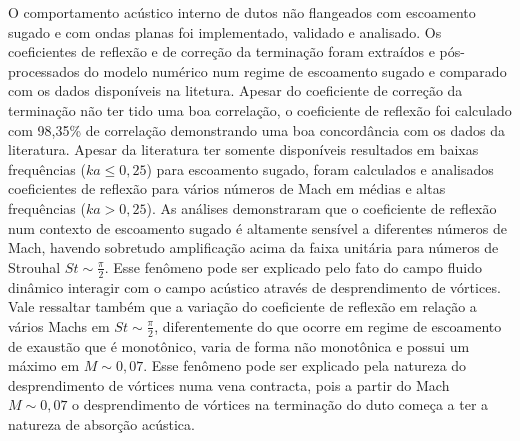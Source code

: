 O comportamento acústico interno de dutos não flangeados com escoamento sugado e com ondas planas foi implementado, validado e analisado. Os coeficientes de reflexão e de correção da terminação foram extraídos e pós-processados do modelo numérico num regime de escoamento sugado e comparado com os dados disponíveis na litetura. Apesar do coeficiente de correção da terminação não ter tido uma boa correlação, o coeficiente de reflexão foi calculado com 98,35\% de correlação demonstrando uma boa concordância com os dados da literatura. Apesar da literatura ter somente disponíveis resultados em baixas frequências ($ka \leq 0,25$) para escoamento sugado, foram calculados e analisados coeficientes de reflexão para vários números de Mach em médias e altas frequências ($ka > 0,25$). As análises demonstraram que o coeficiente de reflexão num contexto de escoamento sugado é altamente sensível a diferentes números de Mach, havendo sobretudo amplificação acima da faixa unitária para números de Strouhal $St \sim \frac{\pi}{2}$. Esse fenômeno pode ser explicado pelo fato do campo fluido dinâmico interagir com o campo acústico através de desprendimento de vórtices. Vale ressaltar também que a variação do coeficiente de reflexão em relação a vários Machs em $St \sim \frac{\pi}{2}$, diferentemente do que ocorre em regime de escoamento de exaustão que é monotônico, varia de forma não monotônica e possui um máximo em $M \sim 0,07$. Esse fenômeno pode ser explicado pela natureza do desprendimento de vórtices numa vena contracta, pois a partir do Mach $M \sim 0,07$ o desprendimento de vórtices na terminação do duto começa a ter a natureza de absorção acústica.  